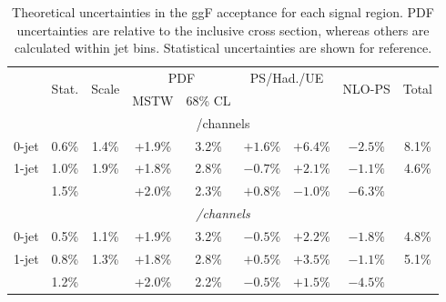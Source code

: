\begin{table}[b]
	\begin{tabular}{r|ccccccc|c}
		& \multirow{2}{*}{Stat.} & \multirow{2}{*}{Scale} & \multicolumn{2}{c}{PDF} & \multicolumn{2}{c}{PS/Had./UE} & \multirow{2}{*}{NLO-PS} & \multirow{2}{*}{Total} \\
		& & & MSTW & 68\% CL & \pythia{6} & \fherwig & & \\
		\hline
		\multicolumn{9}{c}{\ee/\mm channels} \\
		\hline
		0-jet   & 0.6\% & 1.4\% & +1.9\% & 3.2\% & $+1.6\%$ & $+6.4\%$ & $-2.5\%$ & 8.1\% \\
		1-jet   & 1.0\% & 1.9\% & +1.8\% & 2.8\% & $-0.7\%$ & $+2.1\%$ & $-1.1\%$ & 4.6\% \\
		\twojet & 1.5\% &       & +2.0\% & 2.3\% & $+0.8\%$ & $-1.0\%$ & $-6.3\%$ &  \\
		\hline
		\multicolumn{9}{c}{\em/\me channels} \\
		\hline
		0-jet   & 0.5\% & 1.1\% & +1.9\% & 3.2\% & $-0.5\%$ & $+2.2\%$ & $-1.8\%$ & 4.8\% \\
		1-jet   & 0.8\% & 1.3\% & +1.8\% & 2.8\% & $+0.5\%$ & $+3.5\%$ & $-1.1\%$ & 5.1\% \\
		\twojet & 1.2\% &       & +2.0\% & 2.2\% & $-0.5\%$ & $+1.5\%$ & $-4.5\%$ &  \\
	\end{tabular}
	\caption{Theoretical uncertainties in the ggF acceptance for each signal region. PDF 
	uncertainties are relative to the inclusive cross section, whereas others are 
	calculated within jet bins. Statistical uncertainties are shown for reference.}
	\label{tab:signal:acc_unc_summary}
\end{table}


